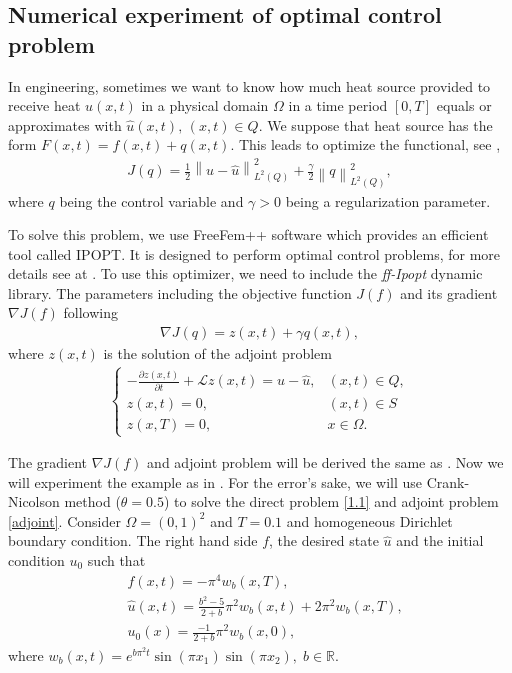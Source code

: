 \newpage
\subsection{Numerical experiment of optimal control problem}
\quad In engineering, sometimes we want to know how much heat source provided to receive heat $u(x, t)$ in a physical domain $\Omega$ in a time period $[0, T]$ equals or approximates with $\hat{u}(x, t),\, (x, t)\in Q.$ We suppose that heat source has the form $F(x, t)=f(x, t)+q(x, t)$. This leads to optimize the functional, see \cite{H92-2, H92-3},
\begin{align}\label{J}
	J(q)=\frac{1}{2}\left\|u-\hat{u}\right\|_{L^2(Q)}^2+\frac{\gamma}{2}\left\|q\right\|_{L^2(Q)}^2,
\end{align}
where $q$ being the control variable and $\gamma>0$ being a regularization parameter.

To solve this problem, we use FreeFem++ software which provides an efficient tool called IPOPT. It is designed to perform optimal control problems, for more details see at \cite{A, AL06}. To use this optimizer, we need to include the \textit{ff-Ipopt} dynamic library. The parameters including the objective function $J(f)$ and its gradient $\nabla J(f)$ following
\begin{align}\label{gradJ}
	\nabla J(q)=z(x, t)+\gamma q(x, t),
	\end{align}
	where $z(x, t)$ is the solution of the adjoint problem
	\begin{align}\label{adjoint} 
	\begin{cases}
		-\frac{\partial z(x, t)}{\partial t}+\mathcal{L}z(x, t)=u-\hat{u}, & (x, t)\in Q,\\
		z(x, t)=0, & (x, t)\in S\\
		z(x, T)=0, & x\in \Omega.
	\end{cases}
\end{align}

The gradient $\nabla J(f)$ and adjoint problem will be derived the same as \cite{HTLI14}. Now we will experiment the example as in \cite{DB08}. For the error's sake, we will use Crank-Nicolson method ($\theta=0.5$) to solve the direct problem \eqref{1.1} and adjoint problem \eqref{adjoint}. Consider $\Omega=(0, 1)^2$ and $T=0.1$ and homogeneous Dirichlet boundary condition. The right hand side $f$, the desired state $\hat{u}$ and the initial condition $u_0$ such that
\begin{align*}
	&f(x, t)=-\pi^4w_b(x, T),\\
	&\hat{u}(x, t)=\frac{b^2-5}{2+b}\pi^2 w_b(x, t)+2\pi^2w_b(x, T),\\
	&u_0(x)=\frac{-1}{2+b}\pi^2w_b(x, 0),
\end{align*}
where $w_b(x, t)=e^{b\pi^2 t}\sin(\pi x_1)\sin(\pi x_2), \; b\in \mathbb{R}$.

